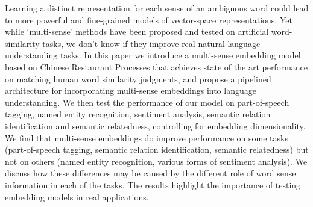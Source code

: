 Learning a distinct representation for each sense of an ambiguous word could lead to more powerful and fine-grained models of vector-space representations. Yet while `multi-sense' methods have been proposed and tested on artificial word-similarity tasks, we don't know if they improve real natural language understanding tasks. In this paper we introduce a multi-sense embedding model based on Chinese Restaurant Processes that achieves state of the art performance on matching human word similarity judgments, and propose a pipelined architecture for incorporating multi-sense embeddings into language understanding. We then test the performance of our model on part-of-speech tagging, named entity recognition, sentiment analysis, semantic relation identification and semantic relatedness, controlling for embedding dimensionality. We find that multi-sense embeddings do improve performance on some tasks (part-of-speech tagging, semantic relation identification, semantic relatedness) but not on others (named entity recognition, various forms of sentiment analysis). We discuss how these differences may be caused by the different role of word sense information in each of the tasks.  The results highlight the importance of testing embedding models in real applications.

